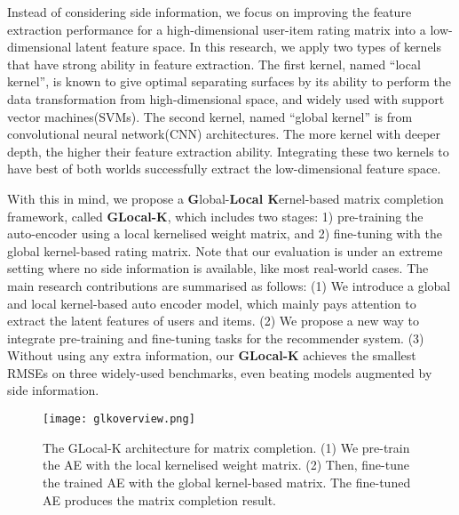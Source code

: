 \documentclass[sigconf]{acmart}
\begin{document}
Instead of considering side information, we focus on improving the feature extraction performance for a high-dimensional user-item rating matrix into a low-dimensional latent feature space. In this research, we apply two types of kernels that have strong ability in feature extraction. The first kernel, named ``local kernel'', is known to give optimal separating surfaces by its ability to perform the data transformation from high-dimensional space, and widely used with support vector machines(SVMs). The second kernel, named ``global kernel'' is from convolutional neural network(CNN) architectures. The more kernel with deeper depth, the higher their feature extraction ability. Integrating these two kernels to have best of both worlds successfully extract the low-dimensional feature space.

With this in mind, we propose a \textbf{G}lobal-\textbf{Local K}ernel-based matrix completion framework, called \textbf{GLocal-K}, which includes two stages: 1) pre-training the auto-encoder using a local kernelised weight matrix, and 2) fine-tuning with the global kernel-based rating matrix. Note that our evaluation is under an extreme setting where no side information is available, like most real-world cases. The main research contributions are summarised as follows: (1) We introduce a global and local kernel-based auto encoder model, which mainly pays attention to extract the latent features of users and items. (2) We propose a new way to integrate pre-training and fine-tuning tasks for the recommender system. (3) Without using any extra information, our \textbf{GLocal-K} achieves the smallest RMSEs on three widely-used benchmarks, even beating models augmented by side information.

\begin{figure*}[t]
\centering
\texttt{[image: glkoverview.png]}
\vspace{-0.75cm}
\caption{The GLocal-K architecture for matrix completion. (1) We pre-train the AE with the local kernelised weight matrix. (2) Then, fine-tune the trained AE with the global kernel-based matrix. The fine-tuned AE produces the matrix completion result.}
\label{fig:overview}
\end{figure*}
\end{document}
